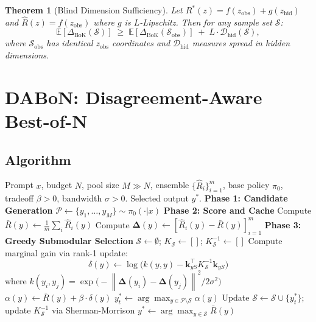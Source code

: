 \documentclass{article}
\newtheorem{theorem}{Theorem}
\newcommand{\E}{\mathbb{E}}
\newcommand{\cS}{\mathcal{S}}
\newcommand{\Rhat}{\hat{R}}
\newcommand{\Rbar}{\bar{R}}
\newcommand{\Rstar}{R^{*}}
\newcommand{\DeltaBoK}{\Delta_{\mathrm{BoK}}}
\newcommand{\Deltavec}{\boldsymbol{\Delta}}
\newcommand{\pibase}{\pi_0}
\newcommand{\norm}[1]{\left\|#1\right\|}
\begin{document}
\begin{theorem}[Blind Dimension Sufficiency]
\label{thm:blind}
Let $\Rstar(z) = f(z_{\mathrm{obs}}) + g(z_{\mathrm{hid}})$ and
$\Rhat(z) = f(z_{\mathrm{obs}})$ where $g$ is $L$-Lipschitz.  Then for any
sample set $\cS$:
\[
  \E[\DeltaBoK(\cS)] \;\ge\; \E[\DeltaBoK(\cS_{\mathrm{obs}})]
  \;+\; L \cdot \mathcal{D}_{\mathrm{hid}}(\cS),
\]
where $\cS_{\mathrm{obs}}$ has identical $z_{\mathrm{obs}}$ coordinates and
$\mathcal{D}_{\mathrm{hid}}$ measures spread in hidden dimensions.
\end{theorem}

\section{DABoN: Disagreement-Aware Best-of-N}
\label{sec:dabon}

\subsection{Algorithm}
\label{sec:alg}

\begin{algorithm}[t]
\caption{DABoN: Disagreement-Aware Best-of-N}
\label{alg:dabon}
\begin{algorithmic}[1]
\Require Prompt $x$, budget $N$, pool size $M \gg N$, ensemble
  $\{\Rhat_i\}_{i=1}^m$, base policy $\pibase$, tradeoff $\beta>0$,
  bandwidth $\sigma>0$.
\Ensure Selected output $y^*$.
\State \textbf{Phase 1: Candidate Generation}
\State $\mathcal{P} \leftarrow \{y_1,\dots,y_M\} \sim \pibase(\cdot|x)$
\State \textbf{Phase 2: Score and Cache}
  \State Compute $\Rbar(y) \leftarrow \frac{1}{m}\sum_i \Rhat_i(y)$
  \State Compute $\Deltavec(y) \leftarrow [\Rhat_i(y) - \Rbar(y)]_{i=1}^m$
\EndFor
\State \textbf{Phase 3: Greedy Submodular Selection}
\State $\cS \leftarrow \emptyset$;\; $K_\cS \leftarrow []$;\; $K_\cS^{-1} \leftarrow []$
  \For{each $y \in \mathcal{P} \setminus \cS$}
    \State Compute marginal gain via rank-1 update:
    \[
      \delta(y) \leftarrow \log\!\bigl(k(y,y) - \mathbf{k}_{yS}^\top K_\cS^{-1}
        \mathbf{k}_{yS}\bigr)
    \]
    where $k(y_i,y_j) = \exp\!\bigl(-\norm{\Deltavec(y_i)-\Deltavec(y_j)}^2/2\sigma^2\bigr)$
    \State $\alpha(y) \leftarrow \Rbar(y) + \beta \cdot \delta(y)$
  \EndFor
  \State $y_t^* \leftarrow \arg\max_{y \in \mathcal{P}\setminus\cS} \alpha(y)$
  \State Update $\cS \leftarrow \cS \cup \{y_t^*\}$;\;
    update $K_\cS^{-1}$ via Sherman-Morrison
\EndFor
\State \Return $y^* \leftarrow \arg\max_{y\in\cS} \Rbar(y)$
\end{algorithmic}
\end{algorithm}
\end{document}
